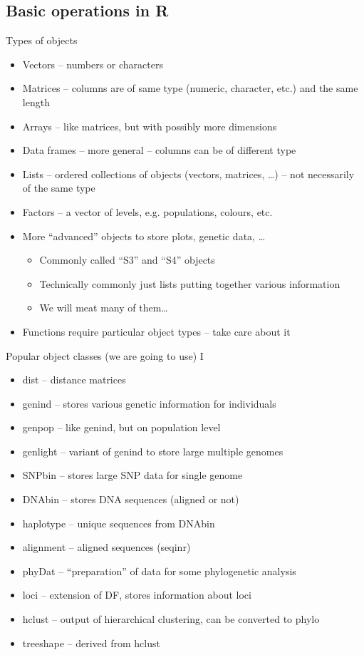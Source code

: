 \documentclass[compress, ucs, xelatex, 11pt, xcolor=svgnames,
  hyperref={
    bookmarks=true,
    unicode=true,
    colorlinks=true,
    pdftitle={Molecular data in R},
    plainpages=false,
    pdfauthor={Vojtech Zeisek},
    pdfsubject={Course about phylogeny and evolution in R},
    pdfcreator={XeLaTeX},
    pdfkeywords={R, evolution, phylogeny, molecular data},
    linkcolor=Tomato,
    anchorcolor=SaddleBrown,
    citecolor=Goldenrod,
    filecolor=DarkMagenta,
    menucolor=Sienna,
    urlcolor=DarkTurquoise,
    pdftex},
  url={hyphens, lowtilde} %
  ]{beamer}
\begin{document}
\subsection{Basic operations in R}

\begin{frame}{Types of objects}
\begin{itemize}
 \item Vectors -- numbers or characters
 \item Matrices -- columns are of same type (numeric, character, etc.) and the same length
 \item Arrays -- like matrices, but with possibly more dimensions
 \item Data frames -- more general -- columns can be of different type
 \item Lists -- ordered collections of objects (vectors, matrices, \ldots) -- not necessarily of the same type
 \item Factors -- a vector of levels, e.g. populations, colours, etc.
 \item More ``advanced'' objects to store plots, genetic data, \ldots
 \begin{itemize}
  \item Commonly called ``S3'' and ``S4'' objects
  \item Technically commonly just lists putting together various information
  \item We will meat many of them\ldots
 \end{itemize}
 \item Functions require particular object types -- take care about it
\end{itemize}
\end{frame}

\begin{frame}{Popular object classes (we are going to use) I}
\begin{itemize}
 \item dist -- distance matrices
 \item genind -- stores various genetic information for individuals
 \item genpop -- like genind, but on population level
 \item genlight -- variant of genind to store large multiple genomes
 \item SNPbin -- stores large SNP data for single genome
 \item DNAbin -- stores DNA sequences (aligned or not)
 \item haplotype -- unique sequences from DNAbin
 \item alignment -- aligned sequences (seqinr)
 \item phyDat -- ``preparation'' of data for some phylogenetic analysis
 \item loci -- extension of DF, stores information about loci
 \item hclust -- output of hierarchical clustering, can be converted to phylo
 \item treeshape -- derived from hclust
\end{itemize}
\end{frame}
\end{document}

